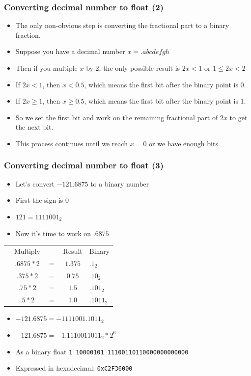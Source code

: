 \documentclass{beamer}
\begin{document}
\begin{frame}
    \frametitle{Converting decimal number to float (2)}
    \begin{itemize}
        \item The only non-obvious step is converting the fractional
            part to a binary fraction.
        \item Suppose you have a decimal number $x = .abcdefgh$
        \item Then if you multiple $x$ by 2, the only possible
            result is $2x < 1$ or $1 \le 2x < 2$
        \item If $2x < 1$, then $x < 0.5$, which means the first
            bit after the binary point is 0.
        \item If $2x \ge 1$, then $x \ge 0.5$, which means the first
            bit after the binary point is 1.
        \item So we set the first bit and work on the remaining
            fractional part of $2x$ to get the next bit.
        \item This process continues until we reach $x = 0$ or we
            have enough bits.
    \end{itemize}
\end{frame}

\begin{frame}
    \frametitle{Converting decimal number to float (3)}
    \begin{itemize}
        \item Let's convert $-121.6875$ to a binary number
        \item First the sign is 0
        \item $121 = 1111001_2$
        \item Now it's time to work on $.6875$
    \end{itemize}
    \begin{tabular}{ccccl}
        \quad\qquad &   Multiply& & Result & Binary \\
        &$.6875*2$ & $=$ & $1.375$ & $.1_2$ \\
        &$.375*2$ & $=$ & $0.75$ &   $.10_2$ \\
        &$.75*2$ & $=$ & $1.5$ &     $.101_2$ \\
        &$.5*2$ & $=$ & $1.0$ &      $.1011_2$ 
    \end{tabular}
    \begin{itemize}
        \item $-121.6875 = -1111001.1011_2$
        \item $-121.6875 = -1.1110011011_2 * 2^6$
        \item As a binary float {\tt 1 10000101 11100110110000000000000}
        \item Expressed in hexadecimal: {\tt 0xC2F36000}
    \end{itemize}
\end{frame}
        
\end{document}
